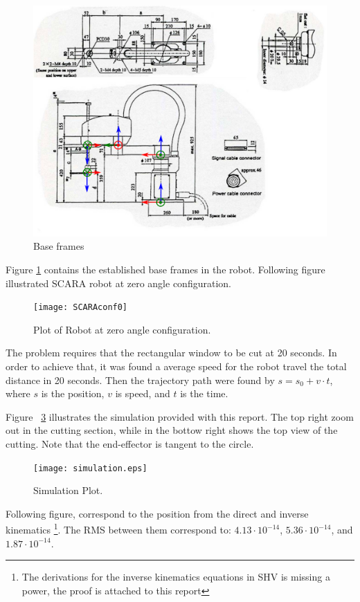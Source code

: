 \documentclass[a4paper,10pt]{article}
\begin{document}
\begin{figure}[H] 
 \centering
 \includegraphics[width=0.7\linewidth]{SCARAview}
 \caption{Base frames}\label{fig:ScaraFrame}
\end{figure}

Figure \ref{fig:ScaraFrame} contains the established base frames in the robot. Following figure illustrated SCARA robot at zero angle configuration.

\begin{figure}[H] 
 \centering
 \texttt{[image: SCARAconf0]}
 \caption{Plot of Robot at zero angle configuration.}\label{fig:ScaraConf0}
\end{figure}

The problem requires that the rectangular window to be cut at 20 seconds. In order to achieve that, it was found a average speed for the robot travel the total distance in 20 seconds. Then the trajectory path were found by $s=s_0+v\cdot t$, where $s$ is the position, $v$ is speed, and $t$ is the time.   

Figure ~\ref{fig:simulation} illustrates the simulation provided with this report. The top right zoom out in the cutting section, while in the bottow right shows the top view of the cutting. Note that the end-effector is tangent to the circle. 

\begin{figure}[H] 
 \centering
 \texttt{[image: simulation.eps]}
 \caption{Simulation Plot.}\label{fig:simulation}
\end{figure}

Following figure, correspond to the position from the direct and inverse kinematics \footnote{The derivations for the inverse kinematics equations in SHV is missing a power, the proof is attached to this report}. The RMS between them correspond to: $4.13\cdot10^{-14}$, $5.36\cdot10^{-14}$, and $1.87\cdot10^{-14}$.
\end{document}
